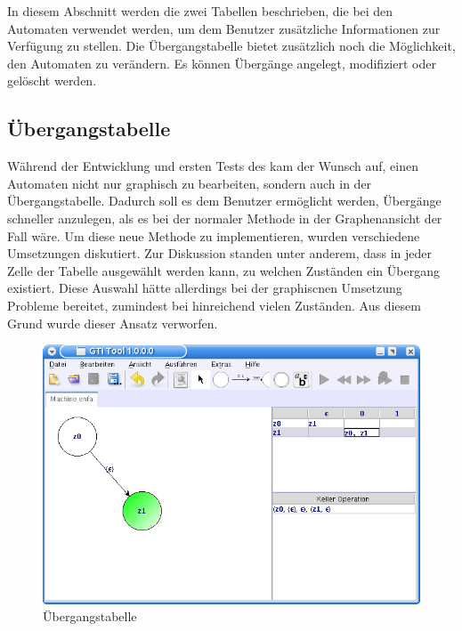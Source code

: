 In diesem Abschnitt werden die zwei Tabellen beschrieben, die bei den Automaten
verwendet werden, um dem Benutzer zusätzliche Informationen zur Verfügung zu
stellen. Die Übergangstabelle bietet zusätzlich noch die Möglichkeit, den
Automaten zu verändern. Es können Übergänge angelegt, modifiziert oder gelöscht
werden.\vspace{10pt}


\subsection{Übergangstabelle}\label{TablesTransition}

Während der Entwicklung und ersten Tests des \gtitools kam der Wunsch auf, einen
Automaten nicht nur graphisch zu bearbeiten, sondern auch in der
Übergangstabelle. Dadurch soll es dem Benutzer ermöglicht werden, Übergänge
schneller anzulegen, als es bei der normaler Methode in der Graphenansicht der
Fall wäre. Um diese neue Methode zu implementieren, wurden verschiedene
Umsetzungen diskutiert. Zur Diskussion standen unter anderem, dass in jeder Zelle
der Tabelle ausgewählt werden kann, zu welchen Zuständen ein Übergang existiert.
Diese Auswahl hätte allerdings bei der graphiscnen Umsetzung Probleme bereitet,
zumindest bei hinreichend vielen Zuständen. Aus diesem Grund wurde dieser Ansatz
verworfen.\vspace{10pt}

\begin{figure}[h!]
\begin{center}
\includegraphics[width=12cm]{../images/machine_table.png}
\caption{Übergangstabelle}
\label{FigureMachineTable}
\end{center}
\end{figure}
\vspace{10pt}

